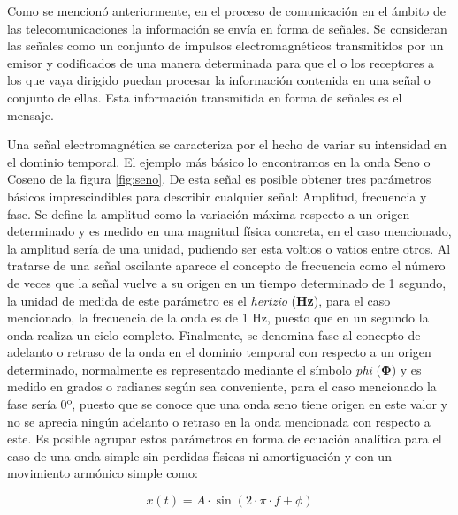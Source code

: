 \par Como se mencionó anteriormente, en el proceso de comunicación en el ámbito de las telecomunicaciones la información se envía en forma de señales. Se consideran las señales como un conjunto de impulsos electromagnéticos transmitidos por un emisor y codificados de una manera determinada para que el o los receptores a los que vaya dirigido puedan procesar la información contenida en una señal o conjunto de ellas. Esta información transmitida en forma de señales es el mensaje.
\\
\par Una señal electromagnética se caracteriza por el hecho de variar su intensidad en el dominio temporal. El ejemplo más básico lo encontramos en la onda Seno o Coseno de la figura
\ref{fig:seno}. De esta señal es posible obtener tres parámetros básicos imprescindibles para describir cualquier señal: Amplitud, frecuencia y fase. Se define la amplitud como la variación máxima respecto a un origen determinado y es medido en una magnitud física concreta, en el caso mencionado, la amplitud sería de una unidad, pudiendo ser esta voltios o vatios entre otros. Al tratarse de una señal oscilante aparece el concepto de frecuencia como el número de veces que la señal vuelve a su origen en un tiempo determinado de 1 segundo, la unidad de medida de este parámetro es el \textit{hertzio} (\textbf{Hz}), para el caso mencionado, la frecuencia de la onda es de 1 Hz, puesto que en un segundo la onda realiza un ciclo completo. Finalmente, se denomina fase al concepto de adelanto o retraso de la onda en el dominio temporal con respecto a un origen determinado, normalmente es representado mediante el símbolo \textit{phi} (\textbf{Φ}) y es medido en grados o radianes según sea conveniente, para el caso mencionado la fase sería 0º, puesto que se conoce que una onda seno tiene origen en este valor y no se aprecia ningún adelanto o retraso en la onda mencionada con respecto a este. Es posible agrupar estos parámetros en forma de ecuación analítica para el caso de una onda simple sin perdidas físicas ni amortiguación y con un movimiento armónico simple como:

\begin{equation}
	x(t)=A\cdot \sin(2\cdot\pi\cdot f+\phi )
	\label{eq: seno}
\end{equation}



